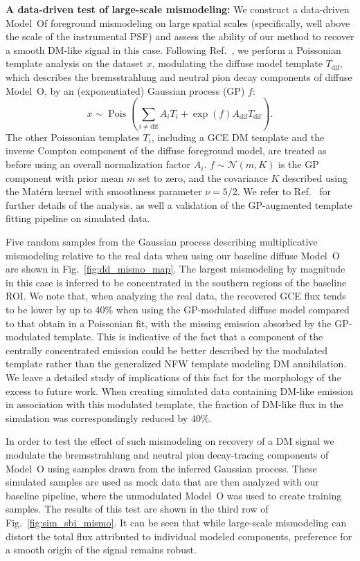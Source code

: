 \documentclass[prd,aps,10pt,nofootinbib,twocolumn,superscriptaddress,preprintnumbers,balancelastpage,longbibliography,floatfix]{revtex4-2}
\begin{document}
\noindent
\textbf{A data-driven test of large-scale mismodeling:}
We construct a data-driven {Model~O}f foreground mismodeling on large spatial scales (specifically, well above the scale of the instrumental PSF) and assess the ability of our method to recover a smooth DM-like signal in this case. Following Ref.~\cite{Mishra-Sharma:2020kjb}, we perform a Poissonian template analysis on the \Fermi dataset $x$, modulating the diffuse model template $T_{\mathrm{dif}}$, which describes the bremsstrahlung and neutral pion decay components of diffuse {Model~O}, by an (exponentiated) Gaussian process (GP) $f$:
\begin{equation}
x \sim \operatorname{Pois}\left(\sum_{i \neq \mathrm{dif}} A_{i} T_{i}+\exp \left(f\right) A_{\mathrm{dif}} T_{\mathrm{dif}}\right).
\end{equation}
The other Poissonian templates $T_{i}$, including a GCE DM template and the inverse Compton component of the diffuse foreground model, are treated as before using an overall normalization factor $A_{i}$. $f \sim \mathcal{N}(m, K)$ is the GP component with prior mean $m$ set to zero, and the covariance $K$ described using the Mat\'ern kernel with smoothness parameter $\nu = 5/2$. We refer to Ref.~\cite{Mishra-Sharma:2020kjb} for further details of the analysis, as well a validation of the GP-augmented template fitting pipeline on simulated data.

Five random samples from the Gaussian process describing multiplicative mismodeling relative to the real \Fermi data when using our baseline diffuse {Model~O} are shown in Fig.~\ref{fig:dd_mismo_map}. The largest mismodeling by magnitude in this case is inferred to be concentrated in the southern regions of the baseline ROI. We note that, when analyzing the real \Fermi data, the recovered GCE flux tends to be lower by up to 40\% when using the GP-modulated diffuse model compared to that obtain in a Poissonian fit, with the missing emission absorbed by the GP-modulated template. This is indicative of the fact that a component of the centrally concentrated emission could be better described by the modulated template rather than the generalized NFW template modeling DM annihilation. We leave a detailed study of implications of this fact for the morphology of the excess to future work. When creating simulated data containing DM-like emission in association with this modulated template, the fraction of DM-like flux in the simulation was correspondingly reduced by 40\%.

In order to test the effect of such mismodeling on recovery of a DM signal we modulate the bremsstrahlung and neutral pion decay-tracing components of {Model~O} using samples drawn from the inferred Gaussian process. These simulated samples are used as mock data that are then analyzed with our baseline pipeline, where the unmodulated {Model~O} was used to create training samples.
The results of this test are shown in the third row of Fig.~\ref{fig:sim_sbi_mismo}. It can be seen that while large-scale mismodeling can distort the total flux attributed to individual modeled components, preference for a smooth origin of the signal remains robust. \\
\end{document}
